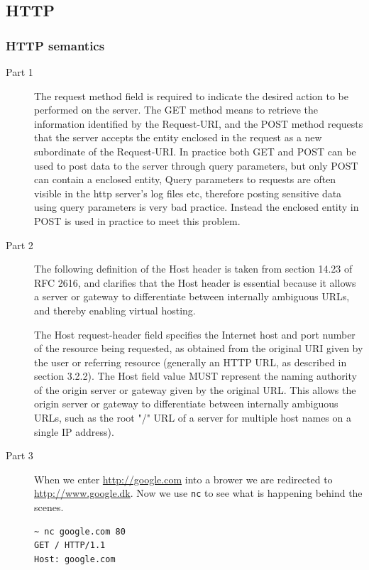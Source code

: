 \documentclass[a4paper]{article}
\begin{document}
\subsection{HTTP}
\subsubsection{HTTP semantics}
\begin{description}
    \item[Part 1] The request method field is required to indicate the desired
        action to be performed on the server. The GET method means to retrieve
        the information identified by the Request-URI, and the POST method
        requests that the server accepts the entity enclosed in the request as
        a new subordinate of the Request-URI. In practice both GET and POST can
        be used to post data to the server through query parameters, but only
        POST can contain a enclosed entity, Query parameters to requests are
        often visible in the http server's log files etc, therefore posting
        sensitive data using query parameters is very bad practice. Instead the
        enclosed entity in POST is used in practice to meet this problem.

    \item[Part 2] The following definition of the Host header is taken from
        section 14.23 of RFC 2616, and clarifies that the Host header is
        essential because it allows a server or gateway to differentiate
        between internally ambiguous URLs, and thereby enabling virtual
        hosting.

        The Host request-header field specifies the Internet host and port
        number of the resource being requested, as obtained from the original
        URI given by the user or referring resource (generally an HTTP URL, as
        described in section 3.2.2). The Host field value MUST represent the
        naming authority of the origin server or gateway given by the original
        URL. This allows the origin server or gateway to differentiate between
        internally ambiguous URLs, such as the root "/" URL of a server for
        multiple host names on a single IP address).

    \item[Part 3] When we enter \url{http://google.com} into a brower we are
        redirected to \url{http://www.google.dk}. Now we use \texttt{nc} to see
        what is happening behind the scenes.

\begin{lstlisting}
~ nc google.com 80
GET / HTTP/1.1
Host: google.com


\end{lstlisting}
\end{description}
\end{document}
